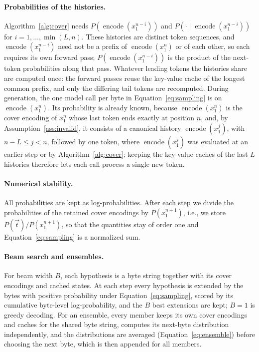 \documentclass{article} %
\newcommand{\enc}{\operatorname{encode}}
\newcommand{\tseq}{\vec{t}}
\begin{document}
\paragraph{Probabilities of the histories.} Algorithm~\ref{alg:cover} needs $P(\enc(x_1^{n-i}))$ and $P(\cdot\mid\enc(x_1^{n-i}))$ for $i=1,\dots,\min(L,n)$. These histories are distinct token sequences, and $\enc(x_1^{n-i})$ need not be a prefix of $\enc(x_1^n)$ or of each other, so each requires its own forward pass; $P(\enc(x_1^{n-i}))$ is the product of the next-token probabilities along that pass. Whatever leading tokens the histories share are computed once: the forward passes reuse the key-value cache of the longest common prefix, and only the differing tail tokens are recomputed. During generation, the one model call per byte in Equation~\ref{eq:sampling} is on $\enc(x_1^{n})$. Its probability is already known, because $\enc(x_1^{n})$ is the cover encoding of $x_1^n$ whose last token ends exactly at position $n$, and, by Assumption~\ref{ass:invalid}, it consists of a canonical history $\enc(x_1^{j})$, with $n-L \le j < n$, followed by one token, where $\enc(x_1^{j})$ was evaluated at an earlier step or by Algorithm~\ref{alg:cover}; keeping the key-value caches of the last $L$ histories therefore lets each call process a single new token.

\paragraph{Numerical stability.} All probabilities are kept as log-probabilities. After each step we divide the probabilities of the retained cover encodings by $P(x_1^{n+1})$, i.e., we store $P(\tseq)/P(x_1^{n+1})$, so that the quantities stay of order one and Equation~\ref{eq:sampling} is a normalized sum.

\paragraph{Beam search and ensembles.} For beam width $B$, each hypothesis is a byte string together with its cover encodings and cached states. At each step every hypothesis is extended by the bytes with positive probability under Equation~\ref{eq:sampling}, scored by its cumulative byte-level log-probability, and the $B$ best extensions are kept; $B=1$ is greedy decoding. For an ensemble, every member keeps its own cover encodings and caches for the shared byte string, computes its next-byte distribution independently, and the distributions are averaged (Equation~\ref{eq:ensemble}) before choosing the next byte, which is then appended for all members.
\end{document}
